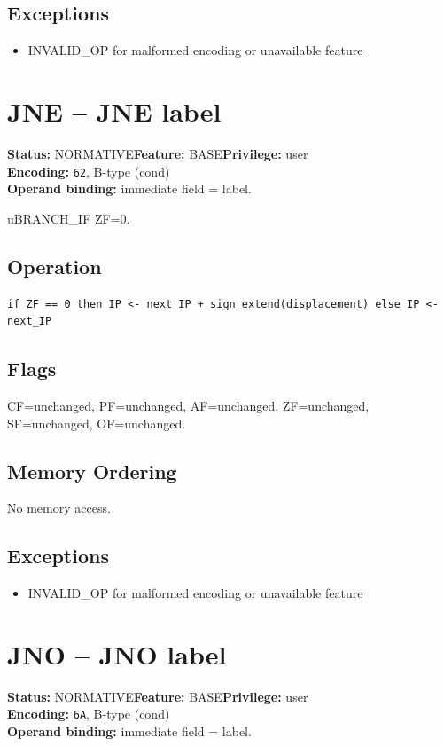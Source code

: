\documentclass[10pt]{article}
\begin{document}
\subsection*{Exceptions}
\begin{itemize}
\item INVALID\_OP for malformed encoding or unavailable feature
\end{itemize}
\clearpage

\section{JNE -- JNE label}
\textbf{Status:} NORMATIVE\quad \textbf{Feature:} BASE\quad \textbf{Privilege:} user\\
\textbf{Encoding:} \texttt{62}, B-type (cond)\\
\textbf{Operand binding:} immediate field = label.

uBRANCH\_IF ZF=0.

\subsection*{Operation}
\begin{lstlisting}
if ZF == 0 then IP <- next_IP + sign_extend(displacement) else IP <- next_IP
\end{lstlisting}
\subsection*{Flags}
CF=unchanged, PF=unchanged, AF=unchanged, ZF=unchanged, SF=unchanged, OF=unchanged.
\subsection*{Memory Ordering}
No memory access.
\subsection*{Exceptions}
\begin{itemize}
\item INVALID\_OP for malformed encoding or unavailable feature
\end{itemize}
\clearpage

\section{JNO -- JNO label}
\textbf{Status:} NORMATIVE\quad \textbf{Feature:} BASE\quad \textbf{Privilege:} user\\
\textbf{Encoding:} \texttt{6A}, B-type (cond)\\
\textbf{Operand binding:} immediate field = label.
\end{document}
